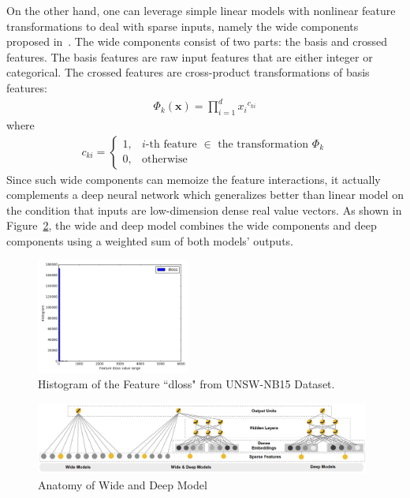 On the other hand, one can leverage simple linear models with nonlinear feature transformations to deal with sparse inputs,
namely the wide components proposed in~\cite{WideDeepModel}.
The wide components consist of two parts: the basis and crossed features.
The basis features are raw input features that are either integer or categorical.
The crossed features are cross-product transformations of basis features:
\begin{align}
    \Phi_k (\bm{x} ) = \prod_{i=1}^{d} {x_i}^{c_{ki}}
\end{align}
where
\begin{align}
    c_{ki} = 
    \begin{cases}
        1, & \text{$i$-th feature $\in$ the transformation $\Phi_k$} \\
        0, & \text{otherwise}
    \end{cases}
\end{align}
Since such wide components can memoize the feature interactions, it actually complements a deep neural network
which generalizes better than linear model on the condition that inputs are low-dimension dense real value vectors.
As shown in Figure~\ref{Fig:WideDeepModel}, the wide and deep model combines the wide components and deep components
using a weighted sum of both models' outputs.

\begin{figure}[h]
    \centering
    \includegraphics[width=0.45\textwidth]{figures/dloss_hist.png}
    \caption{Histogram of the Feature ``dloss" from UNSW-NB15 Dataset.}
    \label{Fig:DlossHist}
\end{figure}

\begin{figure}[h]
    \centering
    \includegraphics[width=0.98\textwidth]{figures/WideDeepModel.png}
    \caption{Anatomy of Wide and Deep Model}
    \label{Fig:WideDeepModel}
\end{figure}
